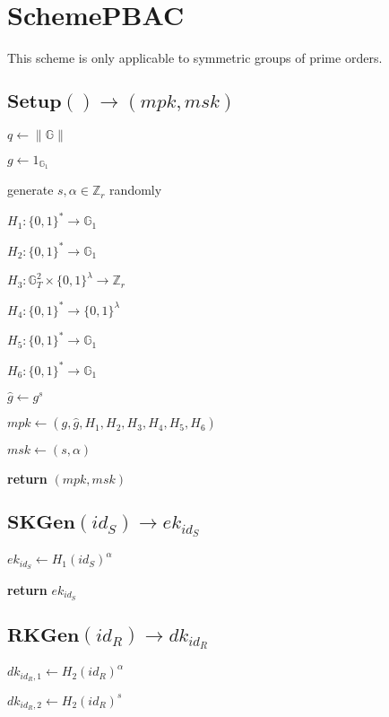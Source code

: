 \documentclass[a4paper]{article}
\begin{document}
\section{SchemePBAC}

This scheme is only applicable to symmetric groups of prime orders. 

\subsection{$\textbf{Setup}() \rightarrow (\textit{mpk}, \textit{msk})$}

$q \gets \|\mathbb{G}\|$

$g \gets 1_{\mathbb{G}_1}$

generate $s, \alpha \in \mathbb{Z}_r$ randomly

$H_1: \{0, 1\}^* \rightarrow \mathbb{G}_1$

$H_2: \{0, 1\}^* \rightarrow \mathbb{G}_1$

$H_3: \mathbb{G}_T^2 \times \{0, 1\}^\lambda \rightarrow \mathbb{Z}_r$

$H_4: \{0, 1\}^* \rightarrow \{0, 1\}^\lambda$

$H_5: \{0, 1\}^* \rightarrow \mathbb{G}_1$

$H_6: \{0, 1\}^* \rightarrow \mathbb{G}_1$

$\hat{g} \gets g^s$

$ \textit{mpk} \gets (g, \hat{g}, H_1, H_2, H_3, H_4, H_5, H_6)$

$\textit{msk} \gets (s, \alpha)$

\textbf{return} $(\textit{mpk}, \textit{msk})$

\subsection{$\textbf{SKGen}(\textit{id}_S) \rightarrow \textit{ek}_{\textit{id}_S}$}

$\textit{ek}_{\textit{id}_S} \gets H_1(\textit{id}_S)^\alpha$

\textbf{return} $\textit{ek}_{\textit{id}_S}$

\subsection{$\textbf{RKGen}(\textit{id}_R) \rightarrow \textit{dk}_{\textit{id}_R}$}

$\textit{dk}_{\textit{id}_R, 1} \gets H_2(\textit{id}_R)^\alpha$

$\textit{dk}_{\textit{id}_R, 2} \gets H_2(\textit{id}_R)^s$
\end{document}
